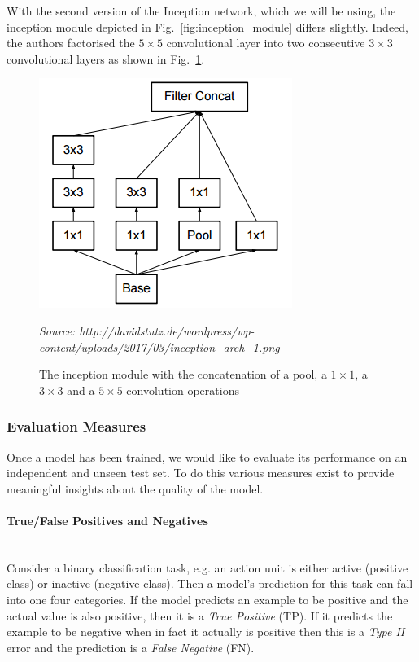 \documentclass[12pt,twoside]{article}
\newcommand{\source}[1]{\vspace{-3pt} \caption*{ \footnotesize{\textit{Source: {#1}}}} }
\newcommand{\para}[1]{\paragraph{#1}\mbox{}\\}
\begin{document}
With the second version of the Inception network, which we will be using, the
inception module depicted in Fig.~\ref{fig:inception_module} differs slightly.
Indeed, the authors factorised the $5 \times 5$ convolutional layer into two
consecutive $3 \times 3$ convolutional layers as shown in
Fig.~\ref{fig:inception_v2_module}.

\begin{figure}[ht]

  \centering
  \includegraphics[scale=0.8]{figures/inception_v2_module.png}
  \caption{The inception module with the concatenation of a pool, a $1 \times
  1$, a $3 \times 3$ and a $5 \times 5$ convolution operations}
  \source{http://davidstutz.de/wordpress/wp-content/uploads/2017/03/inception\_arch\_1.png}
  \label{fig:inception_v2_module}
\end{figure}


\subsubsection{Evaluation Measures}\label{sec:measures}

Once a model has been trained, we would like to evaluate its performance on an
independent and unseen test set. To do this various measures exist to provide
meaningful insights about the quality of the model.

\para{True/False Positives and Negatives}

Consider a binary classification task, e.g. an action unit is either active
(positive class) or inactive (negative class). Then a model's prediction for
this task can fall into one four categories. If the model predicts an example
to be positive and the actual value is also positive, then it is a
\textit{True Positive} (TP). If it predicts the example to be negative when in fact
it actually is positive then this is a \textit{Type II} error and the prediction
is a \textit{False Negative} (FN).
\end{document}
